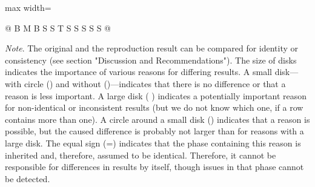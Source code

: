 \documentclass[margin=5pt]{standalone}
\begin{document}
\begin{minipage}{24cm}
\begin{adjustbox}{max width=\linewidth}
\begin{tabularx}{\linewidth}{@{} B M B S S T S S S S S @{}}
    \end{tabularx}
    \end{adjustbox}
    \begin{minipage}{\linewidth}
        \emph{Note}. The original and the reproduction result can be compared for identity or consistency (see section "Discussion and Recommendations"). The size of disks indicates the importance of various reasons for differing results. A small disk---with circle () and without (\bullet)---indicates that there is no difference or that a reason is less important. A large disk ( \faCircle) indicates a potentially important reason for non-identical or inconsistent results (but we do not know which one, if a row contains more than one). A circle around a small disk () indicates that a reason is possible, but the caused difference is probably not larger than for reasons with a large disk. The equal sign (=) indicates that the phase containing this reason is inherited and, therefore, assumed to be identical. Therefore, it cannot be responsible for differences in results by itself, though issues in that phase cannot be detected.
    \end{minipage}
\end{minipage}
\end{document}
